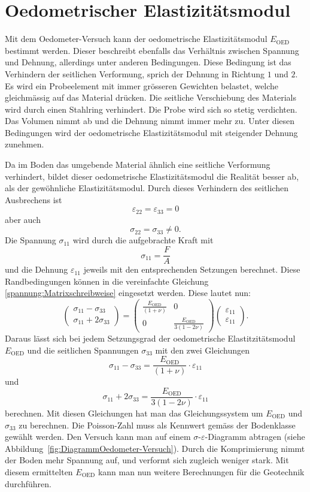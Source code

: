 \section{Oedometrischer Elastizitätsmodul\label{spannung:section:Oedometrischer Elastizitätsmodul}}
Mit dem Oedometer-Versuch kann der oedometrische Elastizitätsmodul $E_{\text{OED}}$ bestimmt werden.
Dieser beschreibt ebenfalls das Verhältnis zwischen Spannung und Dehnung, allerdings unter anderen Bedingungen.
Diese Bedingung ist das Verhindern der seitlichen Verformung, sprich der Dehnung in Richtung $1$ und $2$.
Es wird ein Probeelement mit immer grösseren Gewichten belastet, welche gleichmässig auf das Material drücken.
Die seitliche Verschiebung des Materials wird durch einen Stahlring verhindert.
Die Probe wird sich so stetig verdichten.
Das Volumen nimmt ab und die Dehnung nimmt immer mehr zu.
Unter diesen Bedingungen wird der oedometrische Elastizitätsmodul mit steigender Dehnung zunehmen.

Da im Boden das umgebende Material ähnlich eine seitliche Verformung verhindert,
bildet dieser oedometrische Elastizitätsmodul die Realität besser ab, als der gewöhnliche Elastizitätsmodul.
Durch dieses Verhindern des seitlichen Ausbrechens ist
\[
\varepsilon_{22}
=
\varepsilon_{33}
=
0
\]
aber auch
\[
\sigma_{22}
=
\sigma_{33}
\neq 0
.
\]
Die Spannung $\sigma_{11}$ wird durch die aufgebrachte Kraft mit
\[
\sigma_{11}
=
\frac{F}{A}
\]
und die Dehnung $\varepsilon_{11}$ jeweils mit den entsprechenden Setzungen berechnet.
Diese Randbedingungen können in die vereinfachte Gleichung \eqref{spannung:Matrixschreibweise} eingesetzt werden.
Diese lautet nun:
\[
\begin{pmatrix}
	\sigma_{11}-\sigma_{33} \\
	\sigma_{11}+2\sigma_{33}
\end{pmatrix}
=
\begin{pmatrix}
	\displaystyle{\frac{E_{\text{OED}}}{(1+\nu)}} &                                               0 \\
                                                0 & \displaystyle{\frac{E_{\text{OED}}}{3(1-2\nu)}}
\end{pmatrix}
\begin{pmatrix}
	\varepsilon_{11}\\
	\varepsilon_{11}
\end{pmatrix}
.
\]
Daraus lässt sich bei jedem Setzungsgrad der oedometrische Elastitzitätsmodul $E_{\text{OED}}$ und die seitlichen Spannungen $\sigma_{33}$ mit den zwei Gleichungen
\[
\sigma_{11}-\sigma_{33}
=
\frac{E_{\text{OED}}}{(1+\nu)}\cdot\varepsilon_{11}
\]
und
\[
\sigma_{11}+2\sigma_{33}
=
\frac{E_{\text{OED}}}{3(1-2\nu)}\cdot\varepsilon_{11}
\]
berechnen.
Mit diesen Gleichungen hat man das Gleichungssystem um $E_{\text{OED}}$ und $\sigma_{33}$ zu berechnen.
Die Poisson-Zahl muss als Kennwert gemäss der Bodenklasse gewählt werden.
Den Versuch kann man auf einem $\sigma$-$\varepsilon$-Diagramm abtragen (siehe Abbildung~\ref{fig:DiagrammOedometer-Versuch}).
Durch die Komprimierung nimmt der Boden mehr Spannung auf, und verformt sich zugleich weniger stark.
Mit diesem ermittelten $E_{\text{OED}}$ kann man nun weitere Berechnungen für die Geotechnik durchführen.

